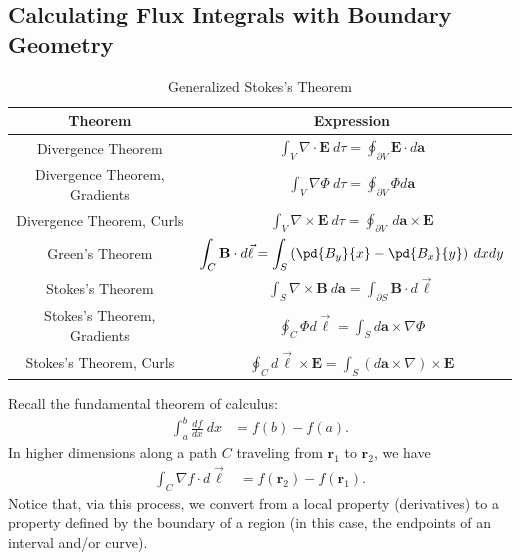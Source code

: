 \documentclass[10pt]{mypackage}
\begin{document}
\subsection{Calculating Flux Integrals with Boundary Geometry}%
\begin{table}
  \renewcommand{\arraystretch}{2}
  \centering
  \begin{tabular}{c|c}
    Theorem & Expression\\
    \hline\hline
    Divergence Theorem & $\displaystyle \int_{V}^{} \nabla \cdot \mathbf{E}\:d\tau = \oint_{\partial V}^{} \mathbf{E}\cdot d\mathbf{a}$\\
    Divergence Theorem, Gradients & $\displaystyle \int_{V}^{} \nabla \Phi\:d\tau = \oint_{\partial V}^{} \Phi d\mathbf{a}$\\
    Divergence Theorem, Curls & $\displaystyle \int_{V}^{} \nabla \times \mathbf{E}\:d\tau = \oint_{\partial V}^{} \:d\mathbf{a}\times \mathbf{E}$\\
    \hline
    Green's Theorem & $\displaystyle \int_{C}^{} \mathbf{B}\cdot d\vec{\ell} = \int_{S}^{} \left(\pd{B_y}{x} - \pd{B_x}{y}\right)\:dxdy$\\
    Stokes's Theorem & $\displaystyle \int_{S}^{} \nabla \times \mathbf{B}\:d\mathbf{a} = \int_{\partial S}^{} \mathbf{B}\cdot d\vec{\ell}$\\
    Stokes's Theorem, Gradients & $\displaystyle \oint_{C}\Phi d\vec{\ell} = \int_{S}d\mathbf{a}\times \nabla \Phi$\\
    Stokes's Theorem, Curls & $\displaystyle \oint_{C}d\vec{\ell}\times \mathbf{E} = \int_{S}\left(d\mathbf{a}\times \nabla\right)\times \mathbf{E}$
  \end{tabular}
  \caption{Generalized Stokes's Theorem}
\end{table}
Recall the fundamental theorem of calculus:
\begin{align*}
  \int_{a}^{b} \frac{df}{dx}\:dx &= f(b) - f(a).
\end{align*}
In higher dimensions along a path $C$ traveling from $\mathbf{r}_1$ to $\mathbf{r}_2$, we have
\begin{align*}
  \int_{C}^{} \nabla f\cdot d\vec{\ell} &= f\left(\mathbf{r}_2\right) - f\left(\mathbf{r}_1\right).
\end{align*}
Notice that, via this process, we convert from a local property (derivatives) to a property defined by the boundary of a region (in this case, the endpoints of an interval and/or curve).
\end{document}
